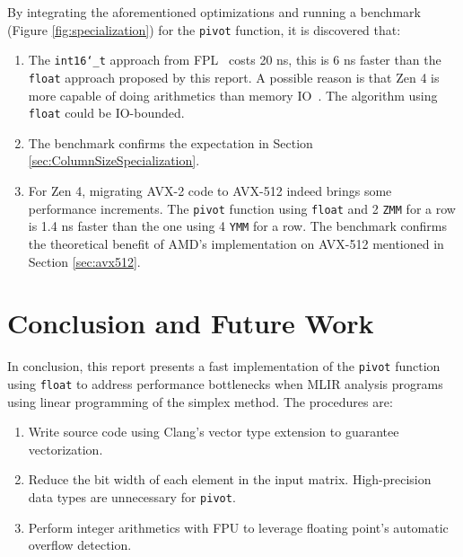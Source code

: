 \documentclass[logo,bsc,singlespacing,parskip]{infthesis}
\newcommand{\dtshort}{\texttt{int16\char`_t}}
\newcommand{\dtfloat}{\texttt{float}}
\newcommand{\pivot}{\texttt{pivot}}
\newcommand{\ymm}{\texttt{YMM}}
\newcommand{\zmm}{\texttt{ZMM}}
\newenvironment{compactlist}
{ \begin{enumerate}
    \setlength{\itemsep}{0pt}
    \setlength{\parskip}{0pt}
    \setlength{\parsep}{0pt}     
}
{ \end{enumerate} }
\begin{document}
By integrating the aforementioned optimizations and running a benchmark (Figure
\ref{fig:specialization}) for the \pivot{} function, it is discovered that:
\begin{enumerate}
    \item The \dtshort{} approach from FPL~\cite{FPL2} costs 20 ns, this is 6 ns
    faster than the \dtfloat{} approach proposed by this report. A possible
    reason is that Zen 4 is more capable of doing arithmetics than memory
    IO~\cite{Zen4Critique}. The algorithm using \dtfloat{} could be IO-bounded. 
    \item The benchmark confirms the expectation in Section
    \ref{sec:ColumnSizeSpecialization}.
    \item For Zen 4, migrating AVX-2 code to AVX-512 indeed
    brings some performance increments. The \pivot{} function using \dtfloat{}
    and 2 \zmm{} for a row is 1.4 ns faster than the one using 4 \ymm{} for a
    row. The benchmark confirms the theoretical benefit of AMD's implementation
    on AVX-512 mentioned in Section \ref{sec:avx512}.

\end{enumerate}



\chapter{Conclusion and Future Work}

In conclusion, this report presents a fast implementation of the \pivot{}
function using \dtfloat{} to address performance bottlenecks when MLIR analysis
programs using linear programming of the simplex method. The procedures are: 
\vspace*{-2.2mm}
\begin{compactlist}
    \item Write source code using Clang's vector type extension to guarantee
    vectorization.
    \item Reduce the bit width of each element in the input matrix.
    High-precision data types are unnecessary for \pivot{}.
    \item Perform integer arithmetics with FPU to leverage floating point's
    automatic overflow detection.
\end{compactlist}
\end{document}
